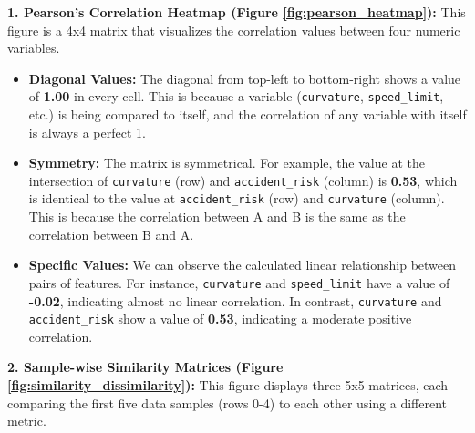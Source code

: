 \documentclass[12pt,a4paper]{article}
\begin{document}
\textbf{1. Pearson's Correlation Heatmap (Figure \ref{fig:pearson_heatmap}):}
This figure is a 4x4 matrix that visualizes the correlation values between four numeric variables.
\begin{itemize}
    \item \textbf{Diagonal Values:} The diagonal from top-left to bottom-right shows a value of \textbf{1.00} in every cell. This is because a variable (\texttt{curvature}, \texttt{speed\_limit}, etc.) is being compared to itself, and the correlation of any variable with itself is always a perfect 1.
    \item \textbf{Symmetry:} The matrix is symmetrical. For example, the value at the intersection of \texttt{curvature} (row) and \texttt{accident\_risk} (column) is \textbf{0.53}, which is identical to the value at \texttt{accident\_risk} (row) and \texttt{curvature} (column). This is because the correlation between A and B is the same as the correlation between B and A.
    \item \textbf{Specific Values:} We can observe the calculated linear relationship between pairs of features. For instance, \texttt{curvature} and \texttt{speed\_limit} have a value of \textbf{-0.02}, indicating almost no linear correlation. In contrast, \texttt{curvature} and \texttt{accident\_risk} show a value of \textbf{0.53}, indicating a moderate positive correlation.
\end{itemize}

\textbf{2. Sample-wise Similarity Matrices (Figure \ref{fig:similarity_dissimilarity}):}
This figure displays three 5x5 matrices, each comparing the first five data samples (rows 0-4) to each other using a different metric.
\end{document}
